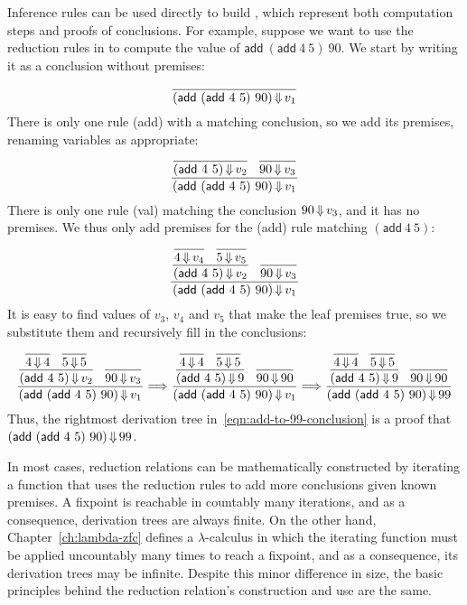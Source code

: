 Inference rules can be used directly to build , which represent both computation steps and proofs of conclusions.
For example, suppose we want to use the reduction rules in  to compute the value of $\mathsf{add}~(\mathsf{add}~4~5)~90$.
We start by writing it as a conclusion without premises:
\begin{equation}
	\dfrac{}{(\mathsf{add}~(\mathsf{add}~4~5)~90) \operatorname{\Downarrow} v_1}
\label{eqn:add-to-99-start}
\end{equation}
There is only one rule (add) with a matching conclusion, so we add its premises, renaming variables as appropriate:
\begin{equation}
	\dfrac{\dfrac{}{(\mathsf{add}~4~5) \operatorname{\Downarrow} v_2} \;\;\, \dfrac{}{90 \operatorname{\Downarrow} v_3}}{(\mathsf{add}~(\mathsf{add}~4~5)~90) \operatorname{\Downarrow} v_1}
\end{equation}
There is only one rule (val) matching the conclusion $90 \operatorname{\Downarrow} v_3$, and it has no premises.
We thus only add premises for the (add) rule matching $(\mathsf{add}~4~5)$:
\begin{equation}
	\dfrac{\dfrac{\dfrac{}{4 \operatorname{\Downarrow} v_4} \;\;\, \dfrac{}{5 \operatorname{\Downarrow} v_5}}{(\mathsf{add}~4~5) \operatorname{\Downarrow} v_2} \;\;\, \dfrac{}{90 \operatorname{\Downarrow} v_3}}{(\mathsf{add}~(\mathsf{add}~4~5)~90) \operatorname{\Downarrow} v_1}
\end{equation}
It is easy to find values of $v_3$, $v_4$ and $v_5$ that make the leaf premises true, so we substitute them and recursively fill in the conclusions:
\begin{equation}
	\dfrac{\dfrac{\dfrac{}{4 \operatorname{\Downarrow} 4} \;\;\, \dfrac{}{5 \operatorname{\Downarrow} 5}}{(\mathsf{add}~4~5) \operatorname{\Downarrow} v_2} \;\;\, \dfrac{}{90 \operatorname{\Downarrow} v_3}}{(\mathsf{add}~(\mathsf{add}~4~5)~90) \operatorname{\Downarrow} v_1}
	\Longrightarrow
	\dfrac{\dfrac{\dfrac{}{4 \operatorname{\Downarrow} 4} \;\;\, \dfrac{}{5 \operatorname{\Downarrow} 5}}{(\mathsf{add}~4~5) \operatorname{\Downarrow} 9} \;\;\, \dfrac{}{90 \operatorname{\Downarrow} 90}}{(\mathsf{add}~(\mathsf{add}~4~5)~90) \operatorname{\Downarrow} v_1}
	\Longrightarrow
	\dfrac{\dfrac{\dfrac{}{4 \operatorname{\Downarrow} 4} \;\;\, \dfrac{}{5 \operatorname{\Downarrow} 5}}{(\mathsf{add}~4~5) \operatorname{\Downarrow} 9} \;\;\, \dfrac{}{90 \operatorname{\Downarrow} 90}}{(\mathsf{add}~(\mathsf{add}~4~5)~90) \operatorname{\Downarrow} 99}
\label{eqn:add-to-99-conclusion}
\end{equation}
Thus, the rightmost derivation tree in~\eqref{eqn:add-to-99-conclusion} is a proof that $(\mathsf{add}~(\mathsf{add}~4~5)~90) \operatorname{\Downarrow} 99$.

In most cases, reduction relations can be mathematically constructed by iterating a function that uses the reduction rules to add more conclusions given known premises.
A fixpoint is reachable in countably many iterations, and as a consequence, derivation trees are always finite.
On the other hand, Chapter~\ref{ch:lambda-zfc} defines a $\lambda$-calculus in which the iterating function must be applied uncountably many times to reach a fixpoint, and as a consequence, its derivation trees may be infinite.
Despite this minor difference in size, the basic principles behind the reduction relation's construction and use are the same.

